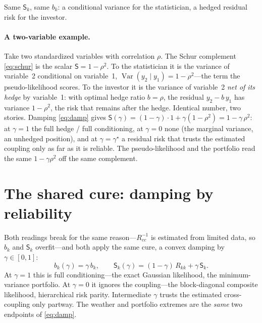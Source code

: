 \documentclass[11pt]{article}
\newcommand{\gstar}{\gamma^\star}
\newcommand{\Sc}{\mathsf S}
\begin{document}
Same $\Sc_k$, same $b_k$: a conditional variance for the statistician, a hedged residual risk for the
investor.

\paragraph{A two-variable example.} Take two standardized variables with correlation $\rho$. The Schur
complement \eqref{eq:schur} is the scalar $\Sc=1-\rho^2$. To the statistician it is the variance of
variable~2 conditional on variable~1, $\operatorname{Var}(y_2\mid y_1)=1-\rho^2$---the term the
pseudo-likelihood scores. To the investor it is the variance of variable~2 \emph{net of its hedge} by
variable~1: with optimal hedge ratio $b=\rho$, the residual $y_2-b\,y_1$ has variance $1-\rho^2$, the
risk that remains after the hedge. Identical number, two stories. Damping
\eqref{eq:damp} gives $\Sc(\gamma)=(1-\gamma)\cdot 1+\gamma(1-\rho^2)=1-\gamma\,\rho^2$: at $\gamma=1$
the full hedge / full conditioning, at $\gamma=0$ none (the marginal variance, an unhedged position),
and at $\gamma=\gstar$ a residual risk that trusts the estimated coupling only as far as it is reliable.
The pseudo-likelihood and the portfolio read the same $1-\gamma\rho^2$ off the same complement.

\section{The shared cure: damping by reliability}
Both readings break for the same reason---$R_{cc}^{-1}$ is estimated from limited data, so $b_k$ and
$\Sc_k$ overfit---and both apply the same cure, a convex damping by $\gamma\in[0,1]$:
\begin{equation}\label{eq:damp}
  b_k(\gamma)=\gamma\,b_k,\qquad \Sc_k(\gamma)=(1-\gamma)\,R_{kk}+\gamma\,\Sc_k.
\end{equation}
At $\gamma=1$ this is full conditioning---the exact Gaussian likelihood, the minimum-variance
portfolio. At $\gamma=0$ it ignores the coupling---the block-diagonal composite likelihood, hierarchical
risk parity. Intermediate $\gamma$ trusts the estimated cross-coupling only partway. The weather and
portfolio extremes are the \emph{same} two endpoints of \eqref{eq:damp}.
\end{document}
